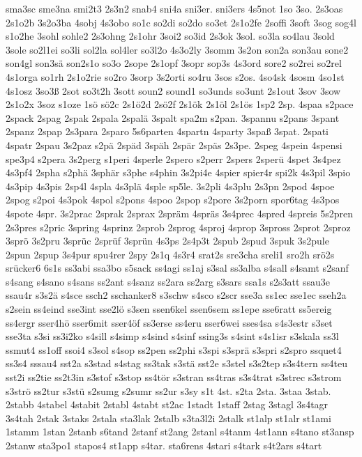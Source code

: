 {sma3sc
sme3na
smi2t3
2s3n2
snab4
sni4a
sni3er.
sni3ers
4s5not
1so
3so.
2s3oas
2s1o2b
3s2o3ba
4sobj
4s3obo
so1c
so2di
so2do
so3et
2s1o2fe
2soffi
3soft
3sog
sog4l
s1o2he
3sohl
sohle2
2s3ohng
2s1ohr
3soi2
so3id
2s3ok
3sol.
so3la
so4lau
3sold
3sole
so2l1ei
so3li
sol2la
sol4ler
so3l2o
4s3o2ly
3somm
3s2on
son2a
son3au
sone2
son4gl
son3sä
son2s1o
so3o
2sope
2s1opf
3sopr
sop3s
4s3ord
sore2
so2rei
so2rel
4s1orga
so1rh
2s1o2rie
so2ro
3sorp
3s2orti
so4ru
3sos
s2os.
4so4sk
4sosm
4so1st
4s1osz
3so3ß
2sot
so3t2h
3sott
soun2
sound1
so3unds
so3unt
2s1out
3sov
3sow
2s1o2x
3soz
s1oze
1sö
sö2c
2s1ö2d
2sö2f
2s1ök
2s1öl
2s1ös
1sp2
2sp.
4spaa
s2pace
2spack
2spag
2spak
2spala
2spalä
3spalt
spa2m
s2pan.
3spannu
s2pans
3spant
2spanz
2spap
2s3para
2sparo
5s6parten
4spartn
4sparty
3spaß
3spat.
2spati
4spatr
2spau
3s2paz
s2pä
2späd
3späh
2spär
2späs
2s3pe.
2speg
4spein
4spensi
spe3p4
s2pera
3s2perg
s1peri
4sperle
2spero
s2perr
2spers
2sperü
4spet
3s4pez
4s3pf4
2spha
s2phä
3sphär
s3phe
s4phin
3s2pi4e
4spier
spier4r
spi2k
4s3pil
3spio
4s3pip
4s3pis
2sp4l
4spla
4s3plä
4sple
sp5le.
3s2pli
4s3plu
2s3pn
2spod
4spoe
2spog
s2poi
4s3pok
4spol
s2pons
4spoo
2spop
s2pore
3s2porn
spor6tag
4s3pos
4spote
4spr.
3s2prac
2sprak
2sprax
2spräm
4spräs
3s4prec
4spred
4spreis
5s2pren
2s3pres
s2pric
3spring
4sprinz
2sprob
2sprog
4sproj
4sprop
3spross
2sprot
2sproz
3sprö
3s2pru
3sprüc
2sprüf
3sprün
4s3ps
2s4p3t
2spub
2spud
3spuk
3s2pule
2spun
2spup
3s4pur
spu4rer
2spy
2s1q
4s3r4
srat2s
sre3cha
sreli1
sro2h
srö2s
srücker6
6s1s
ss3abi
ssa3bo
s5sack
ss4agi
ss1aj
s3sal
ss3alba
s4sall
s4samt
s2sanf
s4sang
s4sano
s4sans
ss2ant
s4sanz
ss2ara
ss2arg
s3sars
ssa1s
s2s3att
ssau3e
ssau4r
s3s2ä
s4sce
ssch2
sschanker8
s3schw
s4sco
s2scr
sse3a
ss1ec
sse1ec
sseh2a
s2sein
ss4eind
sse3int
sse2lö
s3sen
ssen6kel
ssen6sem
ss1epe
sse6ratt
ss5ereig
ss4ergr
sser4hö
sser6mit
sser4öf
ss3erse
ss4eru
sser6wei
sses4sa
s4s3estr
s3set
sse3ta
s3si
ss3i2ko
s4sill
s4simp
s4sind
s4sinf
ssing3s
s4sint
s4s1isr
s3skala
ss3l
ssmut4
ss1off
ssoi4
s3sol
s4sop
ss2pen
ss2phi
s3spi
s3sprä
s3spri
s2spro
ssquet4
ss3s4
sssau4
sst2a
s3stad
s4stag
ss3tak
s3stä
sst2e
s3stel
s3s2tep
s3s4tern
ss4teu
sst2i
ss2tie
ss2t3in
s3stof
s3stop
ss4tör
s3stran
ss4tras
s3s4trat
s3strec
s3strom
s3strö
ss2tur
s3stü
s2sumg
s2sumr
ss2ur
s3sy
s1t
4st.
s2ta
2sta.
3staa
3stab.
2stabb
4stabel
4stabit
2stabl
4stabt
st2ac
1stadt
1staff
2stag
3stagl
3s4tagr
3s4tah
2stak
3staks
2stala
sta3lak
2stalb
s3ta3l2i
2stalk
st1alp
st1alr
st1ami
1stamm
1stan
2stanb
s6tand
2stanf
st2ang
2stanl
s4tanm
4st1ann
s4tano
st3ansp
2stanw
sta3po1
stapos4
st1app
s4tar.
sta6rens
4stari
s4tark
s4t2ars
s4tart
}
